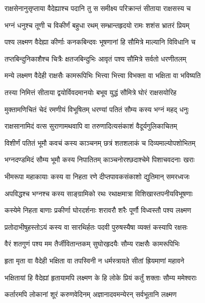 \twolineshloka
{राक्षसेनानुसृप्ताया वैदेह्याश्च पदानि तु}
{स समीक्ष्य परिक्रान्तं सीताया राक्षसस्य च} %

\twolineshloka
{भग्नं धनुश्च तूणी च विकीर्णं बहुधा रथम्}
{सम्भ्रान्तहृदयो रामः शशंस भ्रातरं प्रियम्} %

\twolineshloka
{पश्य लक्ष्मण वैदेह्या कीर्णाः कनकबिन्दवः}
{भूषणानां हि सौमित्रे माल्यानि विविधानि च} %

\twolineshloka
{तप्तबिन्दुनिकाशैश्च चित्रैः क्षतजबिन्दुभिः}
{आवृतं पश्य सौमित्रे सर्वतो धरणीतलम्} %

\twolineshloka
{मन्ये लक्ष्मण वैदेही राक्षसैः कामरूपिभिः}
{भित्त्वा भित्त्वा विभक्ता वा भक्षिता वा भविष्यति} %

\twolineshloka
{तस्या निमित्तं सीताया द्वयोर्विवदमानयोः}
{बभूव युद्धं सौमित्रे घोरं राक्षसयोरिह} %

\twolineshloka
{मुक्तामणिचितं चेदं रमणीयं विभूषितम्}
{धरण्यां पतितं सौम्य कस्य भग्नं महद् धनुः} %

\twolineshloka
{राक्षसानामिदं वत्स सुराणामथवापि वा}
{तरुणादित्यसंकाशं वैदूर्यगुलिकाचितम्} %

\twolineshloka
{विशीर्णं पतितं भूमौ कवचं कस्य काञ्चनम्}
{छत्रं शतशलाकं च दिव्यमाल्योपशोभितम्} %

\twolineshloka
{भग्नदण्डमिदं सौम्य भूमौ कस्य निपातितम्}
{काञ्चनोरश्छदाश्चेमे पिशाचवदनाः खराः} %

\twolineshloka
{भीमरूपा महाकायाः कस्य वा निहता रणे}
{दीप्तपावकसंकाशो द्युतिमान् समरध्वजः} %

\twolineshloka
{अपविद्धश्च भग्नश्च कस्य साङ्ग्रामिको रथः}
{रथाक्षमात्रा विशिखास्तपनीयविभूषणाः} %

\twolineshloka
{कस्येमे निहता बाणाः प्रकीर्णा घोरदर्शनाः}
{शरावरौ शरैः पूर्णौ विध्वस्तौ पश्य लक्ष्मण} %

\twolineshloka
{प्रतोदाभीषुहस्तोऽयं कस्य वा सारथिर्हतः}
{पदवी पुरुषस्यैषा व्यक्तं कस्यापि रक्षसः} %

\twolineshloka
{वैरं शतगुणं पश्य मम तैर्जीवितान्तकम्}
{सुघोरहृदयैः सौम्य राक्षसैः कामरूपिभिः} %

\twolineshloka
{हृता मृता वा वैदेही भक्षिता वा तपस्विनी}
{न धर्मस्त्रायते सीतां ह्रियमाणां महावने} %

\twolineshloka
{भक्षितायां हि वैदेह्यां हृतायामपि लक्ष्मण}
{के हि लोके प्रियं कर्तुं शक्ताः सौम्य ममेश्वराः} %

\twolineshloka
{कर्तारमपि लोकानां शूरं करुणवेदिनम्}
{अज्ञानादवमन्येरन् सर्वभूतानि लक्ष्मण} %


